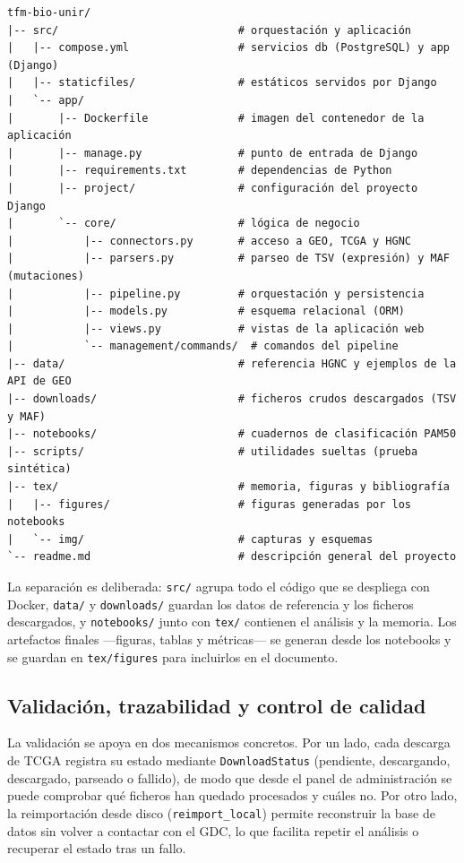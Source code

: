 \documentclass[12pt, a4paper]{report}
\begin{document}
\begin{verbatim}
tfm-bio-unir/
|-- src/                            # orquestación y aplicación
|   |-- compose.yml                 # servicios db (PostgreSQL) y app (Django)
|   |-- staticfiles/                # estáticos servidos por Django
|   `-- app/
|       |-- Dockerfile              # imagen del contenedor de la aplicación
|       |-- manage.py               # punto de entrada de Django
|       |-- requirements.txt        # dependencias de Python
|       |-- project/                # configuración del proyecto Django
|       `-- core/                   # lógica de negocio
|           |-- connectors.py       # acceso a GEO, TCGA y HGNC
|           |-- parsers.py          # parseo de TSV (expresión) y MAF (mutaciones)
|           |-- pipeline.py         # orquestación y persistencia
|           |-- models.py           # esquema relacional (ORM)
|           |-- views.py            # vistas de la aplicación web
|           `-- management/commands/  # comandos del pipeline
|-- data/                           # referencia HGNC y ejemplos de la API de GEO
|-- downloads/                      # ficheros crudos descargados (TSV y MAF)
|-- notebooks/                      # cuadernos de clasificación PAM50
|-- scripts/                        # utilidades sueltas (prueba sintética)
|-- tex/                            # memoria, figuras y bibliografía
|   |-- figures/                    # figuras generadas por los notebooks
|   `-- img/                        # capturas y esquemas
`-- readme.md                       # descripción general del proyecto
\end{verbatim}

La separación es deliberada: \texttt{src/} agrupa todo el código que se despliega con Docker, \texttt{data/} y \texttt{downloads/} guardan los datos de referencia y los ficheros descargados, y \texttt{notebooks/} junto con \texttt{tex/} contienen el análisis y la memoria. Los artefactos finales —figuras, tablas y métricas— se generan desde los notebooks y se guardan en \texttt{tex/figures} para incluirlos en el documento.

\subsection{Validación, trazabilidad y control de calidad}

La validación se apoya en dos mecanismos concretos. Por un lado, cada descarga de TCGA registra su estado mediante \texttt{DownloadStatus} (pendiente, descargando, descargado, parseado o fallido), de modo que desde el panel de administración se puede comprobar qué ficheros han quedado procesados y cuáles no. Por otro lado, la reimportación desde disco (\texttt{reimport\_local}) permite reconstruir la base de datos sin volver a contactar con el GDC, lo que facilita repetir el análisis o recuperar el estado tras un fallo.
\end{document}

